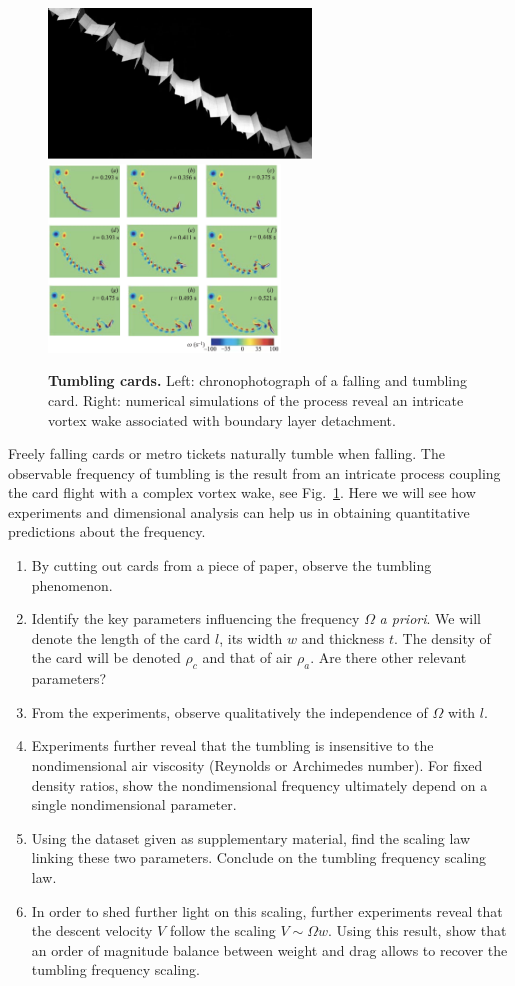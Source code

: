 \documentclass[11pt,a4paper]{article}
\begin{document}
\begin{figure}[ht]
    \centering
    \includegraphics[height=4cm,valign=t]{ristroph.png}
    \hspace{1cm}
    \includegraphics[height=5cm,valign=t]{andersen.png}
    \caption{\textbf{Tumbling cards.} Left: chronophotograph of a falling and tumbling card. Right: numerical simulations of the process reveal an intricate vortex wake associated with boundary layer detachment.}
    \label{fig:tumbling}
\end{figure}
Freely falling cards or metro tickets naturally tumble when falling. The observable frequency of tumbling is the result from an intricate process coupling the card flight with a complex vortex wake, see Fig.~\ref{fig:tumbling}. Here we will see how experiments and dimensional analysis can help us in obtaining quantitative predictions about the frequency.
\begin{enumerate}
\item By cutting out cards from a piece of paper, observe the tumbling phenomenon.
\item Identify the key parameters influencing the frequency $\Omega$ \textit{a priori}. We will denote the length of the card $l$, its width $w$ and thickness $t$. The density of the card will be denoted $\rho_c$ and that of air $\rho_a$. Are there other relevant parameters?
\item From the experiments, observe qualitatively the independence of $\Omega$ with $l$.
\item Experiments further reveal that the tumbling is insensitive to the nondimensional air viscosity (Reynolds or Archimedes number). For fixed density ratios, show the nondimensional frequency ultimately depend on a single nondimensional parameter.
\item Using the dataset given as supplementary material, find the scaling law linking these two parameters. Conclude on the tumbling frequency scaling law. 
\item In order to shed further light on this scaling, further experiments reveal that the descent velocity $V$ follow the scaling $V \sim \Omega w$. Using this result, show that an order of magnitude balance between weight and drag allows to recover the tumbling frequency scaling.
\end{enumerate}
\end{document}
